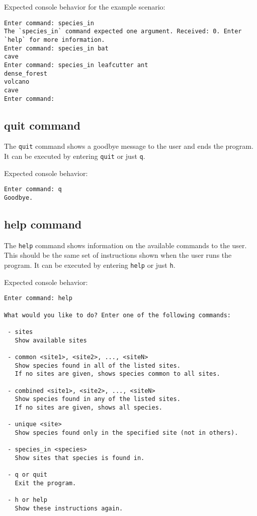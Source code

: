 \documentclass[12pt,letterpaper]{article}
\begin{document}
Expected console behavior for the example scenario:
\begin{lstlisting}
Enter command: species_in
The `species_in` command expected one argument. Received: 0. Enter `help` for more information.
Enter command: species_in bat
cave
Enter command: species_in leafcutter ant
dense_forest
volcano
cave
Enter command: 
\end{lstlisting}

\subsection{quit command}
The \texttt{quit} command shows a goodbye message to the user and ends the program. It can be executed by entering \texttt{quit} or just \texttt{q}.

Expected console behavior:
\begin{lstlisting}
Enter command: q
Goodbye.
\end{lstlisting}

\subsection{help command}
The \texttt{help} command shows information on the available commands to the user. This should be the same set of instructions shown when the user runs the program. It can be executed by entering \texttt{help} or just \texttt{h}.

Expected console behavior:
\begin{lstlisting}
Enter command: help

What would you like to do? Enter one of the following commands:

 - sites
   Show available sites

 - common <site1>, <site2>, ..., <siteN>  
   Show species found in all of the listed sites.  
   If no sites are given, shows species common to all sites.

 - combined <site1>, <site2>, ..., <siteN>  
   Show species found in any of the listed sites.  
   If no sites are given, shows all species.

 - unique <site>  
   Show species found only in the specified site (not in others).

 - species_in <species>
   Show sites that species is found in.

 - q or quit  
   Exit the program.

 - h or help  
   Show these instructions again.
\end{lstlisting}
\end{document}
